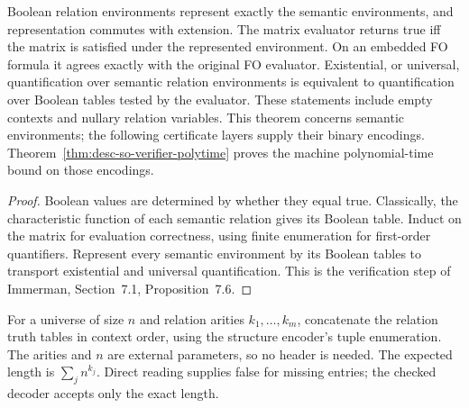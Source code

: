 \begin{theorem}
  \label{thm:desc-matrix-model-checking}
  \leanok
  Boolean relation environments represent exactly the semantic environments,
  and representation commutes with extension. The matrix evaluator returns
  true iff the matrix is satisfied under the represented environment. On an
  embedded FO formula it agrees exactly with the original FO evaluator.
  Existential, or universal, quantification over semantic relation environments
  is equivalent to quantification over Boolean tables tested by the evaluator.
  These statements include empty contexts and nullary relation variables.
  This theorem concerns semantic environments; the following certificate layers
  supply their binary encodings. Theorem~\ref{thm:desc-so-verifier-polytime}
  proves the machine polynomial-time bound on those encodings.
\end{theorem}
\begin{proof}
  \leanok
  Boolean values are determined by whether they equal true. Classically, the
  characteristic function of each semantic relation gives its Boolean table.
  Induct on the matrix for evaluation correctness, using finite enumeration for
  first-order quantifiers. Represent every semantic environment by its Boolean
  tables to transport existential and universal quantification. This is the
  verification step of Immerman, Section~7.1, Proposition~7.6.
\end{proof}

\begin{definition}
  \label{def:desc-so-certificate-encoding}
  \leanok
  For a universe of size $n$ and relation arities $k_1,\ldots,k_m$, concatenate
  the relation truth tables in context order, using the structure encoder's
  tuple enumeration. The arities and $n$ are external parameters, so no header
  is needed. The expected length is $\sum_j n^{k_j}$. Direct reading supplies
  false for missing entries; the checked decoder accepts only the exact length.
\end{definition}

